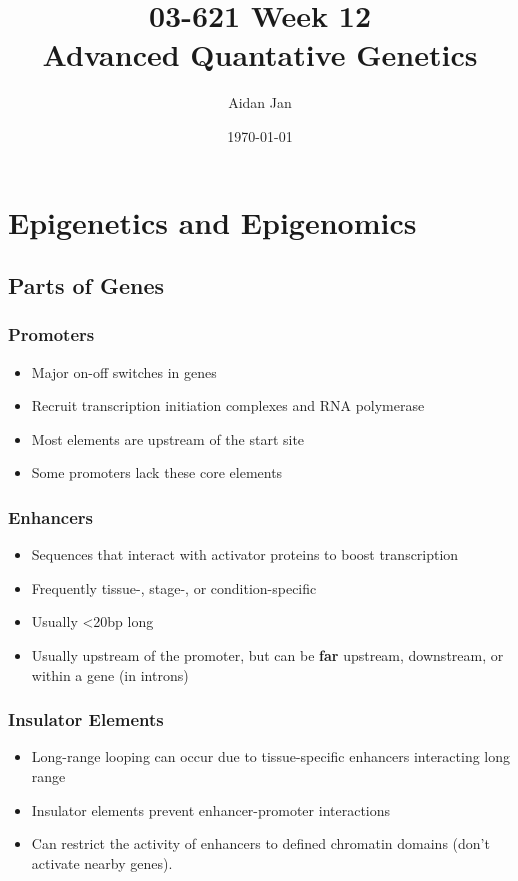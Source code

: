 \documentclass[10pt]{article}
\title{03-621 Week 12 \\ \large{Advanced Quantative Genetics}}
\author{Aidan Jan}
\date{\today}
\begin{document}
\maketitle

\section*{Epigenetics and Epigenomics}
\subsection*{Parts of Genes}
\subsubsection*{Promoters}
\begin{itemize}
	\item Major on-off switches in genes
	\item Recruit transcription initiation complexes and RNA polymerase
	\item Most elements are upstream of the start site
	\item Some promoters lack these core elements
\end{itemize}
\subsubsection*{Enhancers}
\begin{itemize}
	\item Sequences that interact with activator proteins to boost transcription
	\item Frequently tissue-, stage-, or condition-specific
	\item Usually <20bp long
	\item Usually upstream of the promoter, but can be \textbf{far} upstream, downstream, or within a gene (in introns)
\end{itemize}
\subsubsection*{Insulator Elements}
\begin{itemize}
	\item Long-range looping can occur due to tissue-specific enhancers interacting long range
	\item Insulator elements prevent enhancer-promoter interactions
	\item Can restrict the activity of enhancers to defined chromatin domains (don't activate nearby genes).
\end{itemize}
\end{document}
